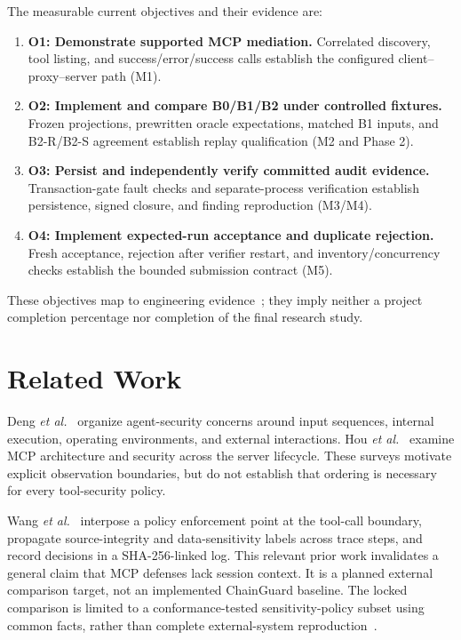 \documentclass[conference]{IEEEtran}
\begin{document}
The measurable current objectives and their evidence are:
\begin{enumerate}
\item \textbf{O1: Demonstrate supported MCP mediation.} Correlated discovery, tool listing, and success/error/success calls establish the configured client--proxy--server path (M1).
\item \textbf{O2: Implement and compare B0/B1/B2 under controlled fixtures.} Frozen projections, prewritten oracle expectations, matched B1 inputs, and B2-R/B2-S agreement establish replay qualification (M2 and Phase 2).
\item \textbf{O3: Persist and independently verify committed audit evidence.} Transaction-gate fault checks and separate-process verification establish persistence, signed closure, and finding reproduction (M3/M4).
\item \textbf{O4: Implement expected-run acceptance and duplicate rejection.} Fresh acceptance, rejection after verifier restart, and inventory/concurrency checks establish the bounded submission contract (M5).
\end{enumerate}
These objectives map to engineering evidence~\cite{cgresults}; they imply neither a project completion percentage nor completion of the final research study.

\section{Related Work}
Deng \emph{et al.}~\cite{deng2025} organize agent-security concerns around input sequences, internal execution, operating environments, and external interactions. Hou \emph{et al.}~\cite{hou2026} examine MCP architecture and security across the server lifecycle. These surveys motivate explicit observation boundaries, but do not establish that ordering is necessary for every tool-security policy.

Wang \emph{et al.}~\cite{wang2026} interpose a policy enforcement point at the tool-call boundary, propagate source-integrity and data-sensitivity labels across trace steps, and record decisions in a SHA-256-linked log. This relevant prior work invalidates a general claim that MCP defenses lack session context. It is a planned external comparison target, not an implemented ChainGuard baseline. The locked comparison is limited to a conformance-tested sensitivity-policy subset using common facts, rather than complete external-system reproduction~\cite{cglock,cgprotocol}.
\end{document}
